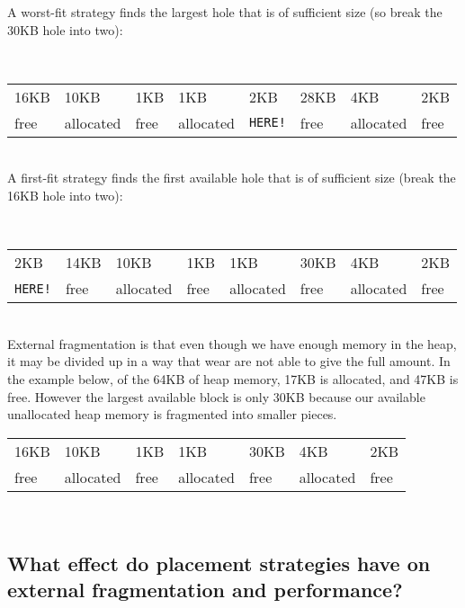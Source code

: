 A worst-fit strategy finds the largest hole that is of sufficient size (so break the 30KB hole into two):

\\
\begin{center}
\begin{tabularx}{\textwidth}{ | X | X | X | X | X | X | X | X | }
\hline
16KB & 10KB & 1KB & 1KB & 2KB & 28KB & 4KB & 2KB \\
free & allocated & free & allocated & \texttt{HERE!} & free & allocated & free \\
\hline
\end{tabularx}
\end{center}
\\

A first-fit strategy finds the first available hole that is of sufficient size (break the 16KB hole into two):

\\
\begin{center}
\begin{tabularx}{\textwidth}{ | X | X | X | X | X | X | X | X | }
\hline
2KB & 14KB & 10KB & 1KB & 1KB & 30KB & 4KB & 2KB \\
\texttt{HERE!} & free & allocated & free & allocated & free & allocated & free \\
\hline
\end{tabularx}
\end{center}
\\

External fragmentation is that even though we have enough memory in the heap, it may be divided up in a way that wear are not able to give the full amount. In the example below, of the 64KB of heap memory, 17KB is allocated, and 47KB is free. However the largest available block is only 30KB because our available unallocated heap memory is fragmented into smaller pieces.
\\
\begin{center}
\begin{tabularx}{\textwidth}{ | X | X | X | X | X | X | X | }
\hline
16KB & 10KB & 1KB & 1KB & 30KB & 4KB & 2KB \\
free & allocated & free & allocated & free & allocated & free \\
\hline
\end{tabularx}
\end{center}
\\

\subsection{What effect do placement strategies have on external fragmentation and performance?}

